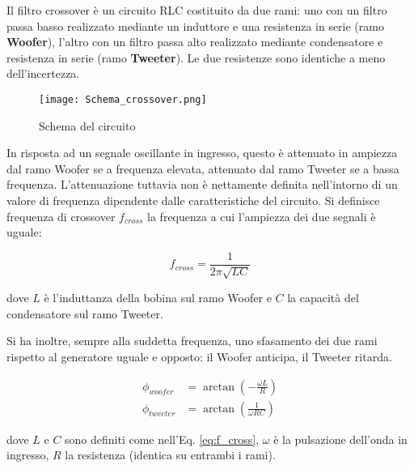 \documentclass[../Relazione_circuiti]{subfiles}
\begin{document}
Il filtro crossover è un circuito RLC costituito da due rami: uno con un filtro passa basso realizzato mediante un
induttore e una resistenza in serie (ramo \textbf{Woofer}), l'altro con un filtro passa alto realizzato mediante
condensatore e resistenza in serie (ramo \textbf{Tweeter}). Le due resistenze sono identiche a meno dell'incertezza.

\begin{figure}[H]
  \centering
  \texttt{[image: Schema\_crossover.png]}

  \caption{Schema del circuito}
  \label{fig:schema_circuito}

\end{figure}

In risposta ad un segnale oscillante in ingresso, questo è attenuato in ampiezza dal ramo Woofer se a frequenza elevata,
attenuato dal ramo Tweeter se a bassa frequenza. L'attenuazione tuttavia non è nettamente definita nell'intorno di un
valore di frequenza dipendente dalle caratteristiche del circuito. Si definisce frequenza di crossover $f_{cross}$ la
frequenza a cui l'ampiezza dei due segnali è uguale:

\begin{equation}
  \label{eq:f_cross}
  f_{cross} = \frac{1}{2 \pi \sqrt{LC} }
\end{equation}

dove $L$ è l'induttanza della bobina sul ramo Woofer e $C$ la capacità del condensatore sul ramo Tweeter.

Si ha inoltre, sempre alla suddetta frequenza, uno sfasamento dei due rami rispetto al generatore uguale e opposto: il
Woofer anticipa, il Tweeter ritarda.

\begin{align}
  \phi_{woofer} &= \arctan(-\frac{\omega L}{R}) \label{eq:p_woofer} \\
  \phi_{tweeter} &= \arctan(\frac{1}{\omega RC}) \label{eq:p_tweeter}
\end{align}


dove $L$ e $C$ sono definiti come nell'Eq. \eqref{eq:f_cross}, $\omega$ è la pulsazione dell'onda in ingresso, $R$ la resistenza
(identica su entrambi i rami).
\end{document}
